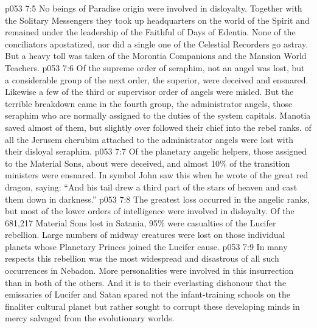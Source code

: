 \vs p053 7:5 No beings of Paradise origin were involved in disloyalty. Together with the Solitary Messengers they took up headquarters on the world of the Spirit and remained under the leadership of the Faithful of Days of Edentia. None of the conciliators apostatized, nor did a single one of the Celestial Recorders go astray. But a heavy toll was taken of the Morontia Companions and the Mansion World Teachers.
\vs p053 7:6 Of the supreme order of seraphim, not an angel was lost, but a considerable group of the next order, the superior, were deceived and ensnared. Likewise a few of the third or supervisor order of angels were misled. But the terrible breakdown came in the fourth group, the administrator angels, those seraphim who are normally assigned to the duties of the system capitals. Manotia saved almost  of them, but slightly over  followed their chief into the rebel ranks.  of all the Jerusem cherubim attached to the administrator angels were lost with their disloyal seraphim.
\vs p053 7:7 Of the planetary angelic helpers, those assigned to the Material Sons, about  were deceived, and almost 10\% of the transition ministers were ensnared. In symbol John saw this when he wrote of the great red dragon, saying: “And his tail drew a third part of the stars of heaven and cast them down in darkness.”
\vs p053 7:8 The greatest loss occurred in the angelic ranks, but most of the lower orders of intelligence were involved in disloyalty. Of the 681,217 Material Sons lost in Satania, 95\% were casualties of the Lucifer rebellion. Large numbers of midway creatures were lost on those individual planets whose Planetary Princes joined the Lucifer cause.
\vs p053 7:9 \pc In many respects this rebellion was the most widespread and disastrous of all such occurrences in Nebadon. More personalities were involved in this insurrection than in both of the others. And it is to their everlasting dishonour that the emissaries of Lucifer and Satan spared not the infant\hyp{}training schools on the finaliter cultural planet but rather sought to corrupt these developing minds in mercy salvaged from the evolutionary worlds.
